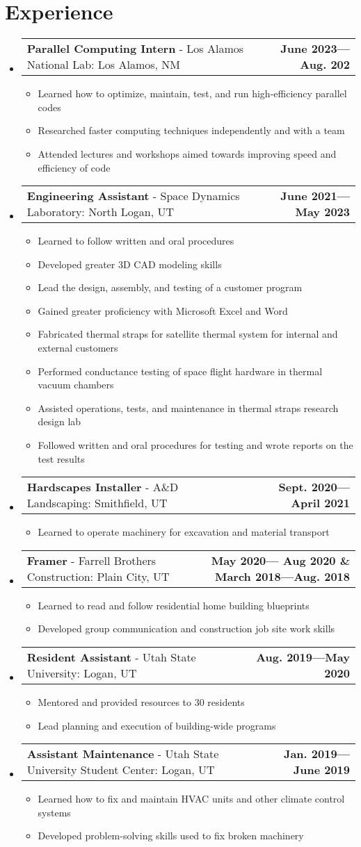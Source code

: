 \documentclass[letterpaper,11pt]{article}
\makeatletter
\newcommand{\resumeExpSubheading}[4]{
  \vspace{-5pt}\item
    \begin{tabular*}{1.0\textwidth}[t]{l@{\extracolsep{\fill}}r}
      \textbf{#1} -  \normalsize#2: \small #3 & \textbf{\small #4}
    \end{tabular*}\vspace{-10pt}
}
\newcommand{\resumeSubHeadingListStart}{\begin{itemize}[leftmargin=0.0in, label={}]}
\newcommand{\resumeSubHeadingListEnd}{\end{itemize}}
\newcommand{\resumeItemListStart}{\begin{itemize}}
\newcommand{\resumeItemListEnd}{\end{itemize}\vspace{-5pt}}
\newcommand{\resumeItem}[1]{ 
  \item\small{
    {#1 \vspace{-5pt}}
  }
}
\makeatother
\begin{document}
\section{Experience}
  \resumeSubHeadingListStart
    \resumeExpSubheading  %
    {Parallel Computing Intern}{Los Alamos National Lab}
    {Los Alamos, NM}{June 2023—Aug. 202}
    \resumeItemListStart
        \resumeItem {Learned how to optimize, maintain, test, and run high-efficiency parallel codes}
        \resumeItem {Researched faster computing techniques independently and with a team}
        \resumeItem {Attended lectures and workshops aimed towards improving speed and efficiency of code}
    \resumeItemListEnd
    \resumeExpSubheading  %
    {Engineering Assistant}{Space Dynamics Laboratory}
    {North Logan, UT}{June 2021—May 2023}  
    \resumeItemListStart
        \resumeItem {Learned to follow written and oral procedures }
        \resumeItem {Developed greater 3D CAD modeling skills}
        \resumeItem {Lead the design, assembly, and testing of a customer program}
        \resumeItem {Gained greater proficiency with Microsoft Excel and Word}
        \resumeItem {Fabricated thermal straps for satellite thermal system for internal and external customers}
        \resumeItem {Performed conductance testing of space flight hardware in thermal vacuum chambers}
        \resumeItem {Assisted operations, tests, and maintenance in thermal straps research design lab}
        \resumeItem {Followed written and oral procedures for testing and wrote reports on the test results}
    \resumeItemListEnd
    \resumeExpSubheading  %
    {Hardscapes Installer}{A\&D Landscaping}
      {Smithfield, UT}{Sept. 2020—April 2021}
      \resumeItemListStart
        \resumeItem {Learned to operate machinery for excavation and material transport}
    \resumeItemListEnd
    \resumeExpSubheading  %
      {Framer}{Farrell Brothers Construction}{ Plain City, UT}{May 2020— Aug 2020 \& March 2018—Aug. 2018}
      \resumeItemListStart
        \resumeItem {Learned to read and follow residential home building blueprints}
        \resumeItem{Developed group communication and construction job site work skills}
    \resumeItemListEnd
    \resumeExpSubheading  %
      {Resident Assistant}{Utah State University}{Logan, UT}{Aug. 2019—May 2020}
      \resumeItemListStart
        \resumeItem {Mentored and provided resources to 30 residents}
        \resumeItem{Lead planning and execution of building-wide programs}
    \resumeItemListEnd
    \resumeExpSubheading  %
      {Assistant Maintenance}{Utah State University Student Center}{ Logan, UT}{Jan. 2019— June 2019}
      \resumeItemListStart
        \resumeItem {Learned how to fix and maintain HVAC units and other climate control systems}
        \resumeItem {Developed problem-solving skills used to fix broken machinery}
    \resumeItemListEnd
  \resumeSubHeadingListEnd
\vspace{-18pt}  
\end{document}

